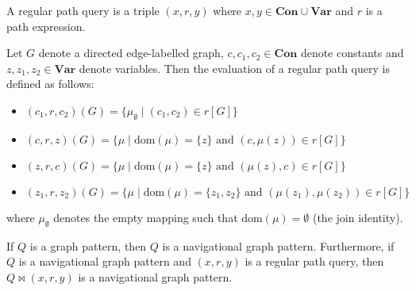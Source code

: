 \begin{definition}\label{def:regular-path-query}
    A regular path query is a triple $(x, r, y)$ where $x, y \in \textbf{Con} \cup \textbf{Var}$ and $r$ is a path expression.
\end{definition}

\begin{definition}\label{def:regular-path-query-evaluation}
    Let $G$ denote a directed edge-labelled graph, $c, c_1, c_2 \in \textbf{Con}$ denote constants and $z, z_1, z_2 \in \textbf{Var}$ denote variables. Then the evaluation of a regular path query is defined as follows:
    \begin{itemize}
        \item $(c_1, r, c_2)(G) = \{\mu_\emptyset \mid (c_1, c_2) \in r[G]\}$
        \item $(c, r, z)(G) = \{\mu \mid \text{dom}(\mu) = \{z\} \text{ and } (c, \mu(z)) \in r[G]\}$
        \item $(z, r, c)(G) = \{\mu \mid \text{dom}(\mu) = \{z\} \text{ and } (\mu(z), c) \in r[G]\}$
        \item $(z_1, r, z_2)(G) = \{\mu \mid \text{dom}(\mu) = \{z_1, z_2\} \text{ and } (\mu(z_1), \mu(z_2)) \in r[G]\}$
    \end{itemize}
    where $\mu_\emptyset$ denotes the empty mapping such that $\text{dom}(\mu) = \emptyset$ (the join identity).
\end{definition}

\begin{definition}\label{def:navigational-graph-pattern}
    If $Q$ is a graph pattern, then $Q$ is a navigational graph pattern. Furthermore, if $Q$ is a navigational graph pattern and $(x, r, y)$ is a regular path query, then $Q \Join (x, r, y)$ is a navigational graph pattern.
\end{definition}


